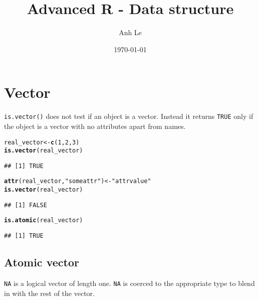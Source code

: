 \documentclass{article}\usepackage[]{graphicx}\usepackage[]{color}
\title{Advanced R - Data structure}
\date{\today}
\author{Anh Le}
\makeatletter
\newcommand{\hlnum}[1]{\textcolor[rgb]{0.686,0.059,0.569}{#1}}%
\newcommand{\hlstr}[1]{\textcolor[rgb]{0.192,0.494,0.8}{#1}}%
\newcommand{\hlstd}[1]{\textcolor[rgb]{0.345,0.345,0.345}{#1}}%
\newcommand{\hlkwb}[1]{\textcolor[rgb]{0.69,0.353,0.396}{#1}}%
\newcommand{\hlkwd}[1]{\textcolor[rgb]{0.737,0.353,0.396}{\textbf{#1}}}%
\newenvironment{kframe}{%
 \def\at@end@of@kframe{}%
 \ifinner\ifhmode%
  \def\at@end@of@kframe{\end{minipage}}%
  \begin{minipage}{\columnwidth}%
 \fi\fi%
 \def\FrameCommand##1{\hskip\@totalleftmargin \hskip-\fboxsep
 \colorbox{shadecolor}{##1}\hskip-\fboxsep
     \hskip-\linewidth \hskip-\@totalleftmargin \hskip\columnwidth}%
 \MakeFramed {\advance\hsize-\width
   \@totalleftmargin\z@ \linewidth\hsize
   \@setminipage}}%
 {\par\unskip\endMakeFramed%
 \at@end@of@kframe}
\newenvironment{knitrout}{}{} %
\makeatother
\begin{document}
\maketitle


\section{Vector}

\verb`is.vector()` does not test if an object is a vector. Instead it returns \verb`TRUE` only if the object is a vector with no attributes apart from names.

\begin{knitrout}
\color{fgcolor}\begin{kframe}
\begin{alltt}
\hlstd{real_vector} \hlkwb{<-} \hlkwd{c}\hlstd{(}\hlnum{1}\hlstd{,} \hlnum{2}\hlstd{,} \hlnum{3}\hlstd{)}
\hlkwd{is.vector}\hlstd{(real_vector)}
\end{alltt}
\begin{verbatim}
## [1] TRUE
\end{verbatim}
\begin{alltt}
\hlkwd{attr}\hlstd{(real_vector,} \hlstr{"someattr"}\hlstd{)} \hlkwb{<-} \hlstr{"attrvalue"}
\hlkwd{is.vector}\hlstd{(real_vector)}
\end{alltt}
\begin{verbatim}
## [1] FALSE
\end{verbatim}
\begin{alltt}
\hlkwd{is.atomic}\hlstd{(real_vector)}
\end{alltt}
\begin{verbatim}
## [1] TRUE
\end{verbatim}
\end{kframe}
\end{knitrout}

\subsection{Atomic vector}

\verb`NA` is a logical vector of length one. \verb`NA` is coerced to the appropriate type to blend in with the rest of the vector.
\end{document}
